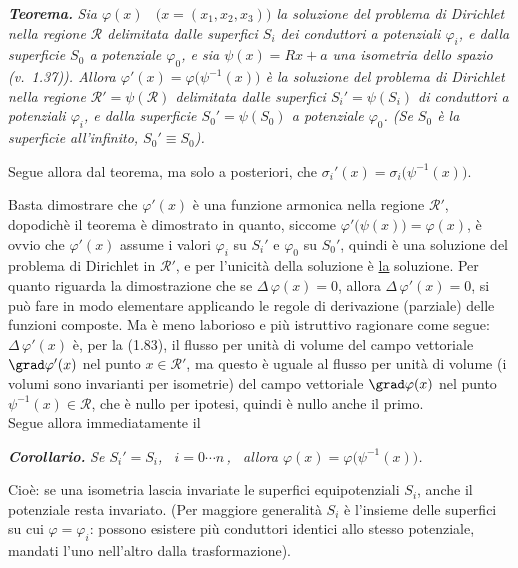 \textbf{\textit{Teorema.}} \textit{Sia $\varphi(x)$
\ $\big(x=(x_1,x_2,x_3)\big)$ la soluzione del problema di Dirichlet nella
regione $\mathcal R$ delimitata dalle superfici $S_i$ dei conduttori a
potenziali $\varphi_i$, e dalla superficie $S_0$ a potenziale $\varphi_0$, e sia
$\psi(x)=Rx+a$ una isometria dello spazio \big(v.\ 1.37)\big). Allora
$\varphi'(x)=\varphi\big(\psi^{-1}(x)\big)$ \`e la soluzione del problema di
Dirichlet nella regione $\mathcal R'=\psi(\mathcal R)$ delimitata dalle
superfici $S_i'=\psi(S_i)$ di conduttori a potenziali $\varphi_i$, e dalla
superficie $S_0'=\psi(S_0)$ a potenziale $\varphi_0$. (Se $S_0$ \`e la
superficie all'infinito, $S_0'\equiv S_0$).}

Segue allora dal teorema, ma solo a posteriori, che
$\sigma_i'(x)=\sigma_i\big(\psi^{-1}(x)\big)$.

Basta dimostrare che $\varphi'(x)$ \`e una funzione armonica nella regione
$\mathcal R'$, dopodich\`e il teorema \`e dimostrato in quanto, siccome
$\varphi'\big(\psi(x)\big)=\varphi(x)$, \`e ovvio che $\varphi'(x)$ assume i
valori $\varphi_i$ su $S_i'$ e $\varphi_0$ su $S_0'$, quindi \`e una soluzione
del problema di Dirichlet in $\mathcal R'$, e per l'unicit\`a della soluzione
\`e \underline{la} soluzione. Per quanto riguarda la dimostrazione che se
$\Delta\,\varphi(x)=0$, allora $\Delta\,\varphi'(x)=0$, si pu\`o fare in modo
elementare applicando le regole di derivazione (parziale) delle funzioni
composte. Ma \`e meno laborioso e pi\`u istruttivo ragionare come segue:
$\Delta\,\varphi'(x)$ \`e, per la (1.83), il flusso per unit\`a di volume del
campo vettoriale $\grad\varphi'(x)$ nel punto $x\in\mathcal R'$, ma questo \`e
uguale al flusso per unit\`a di volume (i volumi sono invarianti per isometrie)
del campo vettoriale $\grad\varphi(x)$ nel punto $\psi^{-1}(x)\in\mathcal R$,
che \`e nullo per ipotesi, quindi \`e nullo anche il primo.\\
Segue allora immediatamente il

\textbf{\textit{Corollario.}} \textit{Se $S_i'=S_i$, \ $i=0\cdots n$\,, \ allora
$\varphi(x)=\varphi\big(\psi^{-1}(x)\big)$.}

Cio\`e: se una isometria lascia invariate le superfici equipotenziali $S_i$,
anche il potenziale resta invariato. (Per maggiore generalit\`a $S_i$ \`e
l'insieme delle superfici su cui $\varphi=\varphi_i$: possono esistere pi\`u
conduttori identici allo stesso potenziale, mandati l'uno nell'altro dalla
trasformazione).

